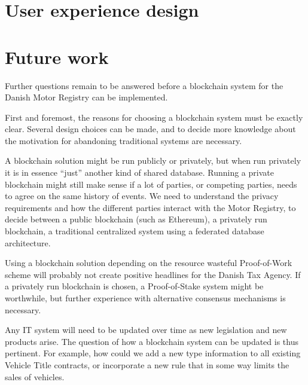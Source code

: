 \documentclass[oneside,a4paper,10pts,article]{memoir}
\begin{document}
\chapter{User experience design}





\chapter{Future work}
\label{sec:futurework}
Further questions remain to be answered before a blockchain system for
the Danish Motor Registry can be implemented.

First and foremost, the reasons for choosing a blockchain system must
be exactly clear. Several design choices can be made, and to decide
more knowledge about the motivation for abandoning traditional systems
are necessary. 

A blockchain solution might be run publicly or privately, but when run
privately it is in essence ``just'' another kind of shared
database. Running a private blockchain might still make sense if a lot
of parties, or competing parties, needs to agree on the same history
of events. We need to understand the privacy requirements and how the
different parties interact with the Motor Registry, to decide between
a public blockchain (such as Ethereum), a privately run blockchain, a
traditional centralized system using a federated database
architecture.

Using a blockchain solution depending on the resource wasteful
Proof-of-Work scheme will probably not create positive headlines for
the Danish Tax Agency. If a privately run blockchain is chosen, a
Proof-of-Stake system might be worthwhile, but further experience with
alternative consensus mechanisms is necessary.

Any IT system will need to be updated over time as new legislation and
new products arise. The question of how a blockchain system can be
updated is thus pertinent. For example, how could we add a new type
information to all existing Vehicle Title contracts, or incorporate a
new rule that in some way limits the sales of vehicles.
\end{document}
